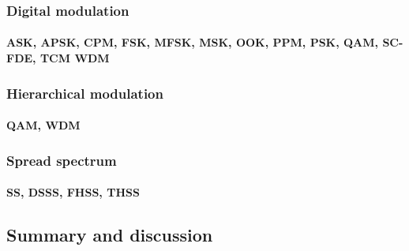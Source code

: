 \subsubsection{Digital modulation}
\paragraph{ASK, APSK, CPM, FSK, MFSK, MSK, OOK, PPM, PSK, QAM, SC-FDE, TCM WDM}

\subsubsection{Hierarchical modulation}
\paragraph{QAM, WDM} 

\subsubsection{Spread spectrum}
\paragraph{SS, DSSS, FHSS, THSS}



\subsection{Summary and discussion}
